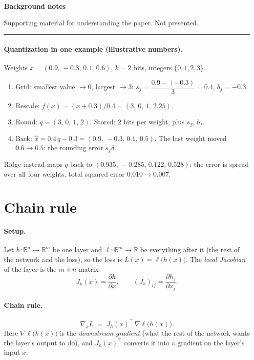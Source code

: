 \documentclass[11pt]{article}
\newcommand{\R}{\mathbb{R}}
\begin{document}
\begin{center}
{\LARGE\bfseries Background notes}\par\vspace{4pt}
{\large Supporting material for understanding the paper. Not presented.}
\end{center}
\vspace{6pt}\hrule\vspace{10pt}

\paragraph{Quantization in one example (illustrative numbers).} Weights $x=(0.9,\,-0.3,\,0.1,\,0.6)$, $k=2$ bits, integers $\{0,1,2,3\}$.
\begin{enumerate}
\item Grid: smallest value $\to 0$, largest $\to 3$: $s_f=\dfrac{0.9-(-0.3)}{3}=0.4$, $b_f=-0.3$.
\item Rescale: $f(x)=(x+0.3)/0.4=(3,\,0,\,1,\,2.25)$.
\item Round: $q=(3,\,0,\,1,\,2)$. Stored: 2 bits per weight, plus $s_f$, $b_f$.
\item Back: $\hat x=0.4\,q-0.3=(0.9,\,-0.3,\,0.1,\,0.5)$. The last weight moved $0.6\to0.5$: the rounding error $s_f\delta$.
\end{enumerate}
Ridge instead maps $q$ back to $(0.935,\,-0.285,\,0.122,\,0.528)$: the error is spread over all four weights, total squared error $0.010\to0.007$.

\clearpage
\section{Chain rule}

\paragraph{Setup.} Let $h:\R^n\to\R^m$ be one layer and $\ell:\R^m\to\R$ be everything after it (the rest of the network and the loss), so the loss is $L(x)=\ell\big(h(x)\big)$. The \emph{local Jacobian} of the layer is the $m\times n$ matrix
\[
J_h(x)=\frac{\partial h}{\partial x},\qquad (J_h)_{ij}=\frac{\partial h_i}{\partial x_j}.
\]

\paragraph{Chain rule.}
\[
\nabla_x L \;=\; J_h(x)^{\top}\,\nabla \ell\big(h(x)\big).
\]
Here $\nabla \ell\big(h(x)\big)$ is the \emph{downstream gradient} (what the rest of the network wants the layer's output to do), and $J_h(x)^{\top}$ converts it into a gradient on the layer's input $x$.
\end{document}
